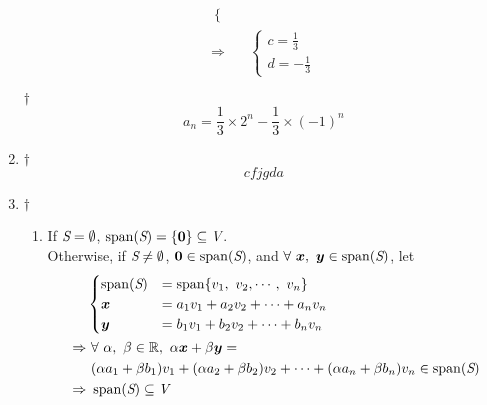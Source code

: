 \documentclass[a4paper,12pt]{article}
\begin{document}
\begin{enumerate}
\begin{equation}
\begin{aligned}
\begin{cases}
            \end{cases} \\
            \Rightarrow & \ \begin{cases}
                c = \frac{1}{3} \\
                d = -\frac{1}{3}
            \end{cases}
        \end{aligned}
    \end{equation}
    \begin{answer}{$\dag$}\begin{equation}
            a_n = \frac{1}{3} \times 2^n - \frac{1}{3} \times (-1)^n
        \end{equation}
    \end{answer}
    \item\begin{answer}{$\dag$}\begin{equation}
            cfjgda
        \end{equation}
    \end{answer}
    \item \begin{answer}{$\dag$} \quad \begin{enumerate}[label=(\alph*)]
            \item If $\textit{S} = \emptyset$, $\operatorname{span}(\textit{S}) = \{\boldsymbol{0}\} \subseteq \textit{V}$. \\ 
            Otherwise, if $\textit{S} \neq \emptyset$, $\boldsymbol{0} \in \operatorname{span}(\textit{S})$, and $\forall \ \boldsymbol{x}, \ \boldsymbol{y} \in \operatorname{span}(\textit{S})$, let \begin{equation}
                    \begin{aligned}
                        & \begin{cases}
                            \spn(\spc{S}) & = \spn\{v_1, \ v_2, \cdots, \ v_n\} \\
                            \vec{x} & = a_1v_1 + a_2v_2 + \cdots + a_nv_n \\
                            \vec{y} & = b_1v_1 + b_2v_2 + \cdots + b_nv_n
                        \end{cases} \\
                        \Rightarrow & \ \forall \ \alpha, \ \beta \in \R, \ \alpha\vec{x} + \beta\vec{y} = \\
                        & \ (\alpha a_1 + \beta b_1)v_1 + (\alpha a_2 + \beta b_2)v_2 + \cdots + (\alpha a_n + \beta b_n)v_n \in \spn(\spc{S}) \\
                        \Rightarrow & \ \spn(\spc{S}) \subseteq \V

\end{aligned}
\end{equation}
\end{enumerate}
\end{answer}
\end{enumerate}
\end{document}
